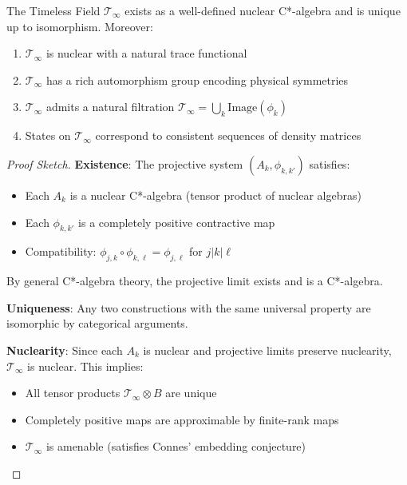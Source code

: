 \begin{level3}
\begin{thm}\label{thm:existence-uniqueness}
The Timeless Field $\mathcal{T}_\infty$ exists as a well-defined nuclear C*-algebra and is unique up to isomorphism. Moreover:
\begin{enumerate}
\item $\mathcal{T}_\infty$ is nuclear with a natural trace functional
\item $\mathcal{T}_\infty$ has a rich automorphism group encoding physical symmetries
\item $\mathcal{T}_\infty$ admits a natural filtration $\mathcal{T}_\infty = \bigcup_k \text{Image}(\phi_k)$
\item States on $\mathcal{T}_\infty$ correspond to consistent sequences of density matrices
\end{enumerate}
\end{thm}

\begin{proof}[Proof Sketch]
\textbf{Existence}: The projective system $(A_k, \phi_{k,k'})$ satisfies:
\begin{itemize}
\item Each $A_k$ is a nuclear C*-algebra (tensor product of nuclear algebras)
\item Each $\phi_{k,k'}$ is a completely positive contractive map
\item Compatibility: $\phi_{j,k} \circ \phi_{k,\ell} = \phi_{j,\ell}$ for $j|k|\ell$
\end{itemize}

By general C*-algebra theory\cite{takesaki_theory_2002}, the projective limit exists and is a C*-algebra.

\textbf{Uniqueness}: Any two constructions with the same universal property are isomorphic by categorical arguments.

\textbf{Nuclearity}: Since each $A_k$ is nuclear and projective limits preserve nuclearity, $\mathcal{T}_\infty$ is nuclear. This implies:
\begin{itemize}
\item All tensor products $\mathcal{T}_\infty \otimes B$ are unique
\item Completely positive maps are approximable by finite-rank maps
\item $\mathcal{T}_\infty$ is amenable (satisfies Connes' embedding conjecture)
\end{itemize}


\end{proof}
\end{level3}
